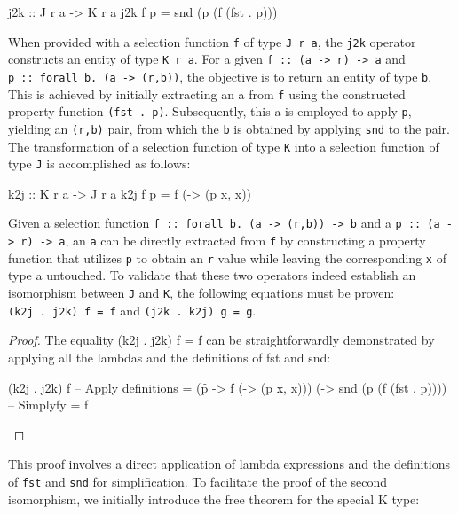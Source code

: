 \documentclass[runningheads]{llncs}
\begin{document}
\begin{code}
j2k :: J r a -> K r a
j2k f p = snd (p (f (fst . p)))
\end{code}

When provided with a selection function \texttt{f} of type
\texttt{J\ r\ a}, the \texttt{j2k} operator constructs an entity of type
\texttt{K\ r\ a}. For a given
\texttt{f\ ::\ (a\ -\textgreater{}\ r)\ -\textgreater{}\ a} and
\texttt{p\ ::\ forall\ b.\ (a\ -\textgreater{}\ (r,b))}, the objective
is to return an entity of type \texttt{b}. This is achieved by initially
extracting an a from \texttt{f} using the constructed property function
\texttt{(fst\ .\ p)}. Subsequently, this a is employed to apply
\texttt{p}, yielding an \texttt{(r,b)} pair, from which the \texttt{b}
is obtained by applying \texttt{snd} to the pair. The transformation of
a selection function of type \texttt{K} into a selection function of
type \texttt{J} is accomplished as follows:

\begin{code}
k2j :: K r a -> J r a
k2j f p = f (\x -> (p x, x)) 
\end{code}

Given a selection function
\texttt{f\ ::\ forall\ b.\ (a\ -\textgreater{}\ (r,b))\ -\textgreater{}\ b}
and a \texttt{p\ ::\ (a\ -\textgreater{}\ r)\ -\textgreater{}\ a}, an
\texttt{a} can be directly extracted from \texttt{f} by constructing a
property function that utilizes \texttt{p} to obtain an \texttt{r} value
while leaving the corresponding \texttt{x} of type a untouched. To
validate that these two operators indeed establish an isomorphism
between \texttt{J} and \texttt{K}, the following equations must be
proven: \texttt{(k2j\ .\ j2k)\ f\ =\ f} and
\texttt{(j2k\ .\ k2j)\ g\ =\ g}.

\begin{proof}
The equality (k2j . j2k) f = f can be straightforwardly demonstrated by applying all the 
lambdas and the definitions of fst and snd:

\begin{haskell}
(k2j . j2k) f
-- {{ Apply definitions}}
= (\f p -> f (\x -> (p x, x))) (\p -> snd (p (f (fst . p))))
-- {{ Simplyfy }}
= f
\end{haskell}

\end{proof}

This proof involves a direct application of lambda expressions and the
definitions of \texttt{fst} and \texttt{snd} for simplification. To
facilitate the proof of the second isomorphism, we initially introduce
the free theorem for the special K type:
\end{document}

